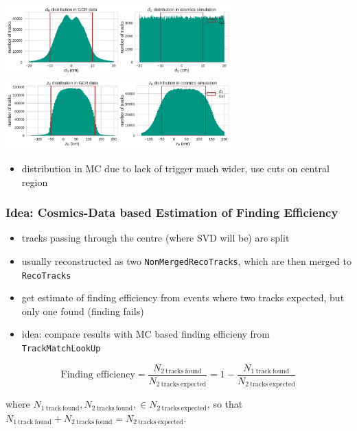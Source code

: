 \documentclass[18pt]{beamer}
\begin{document}
  \begin{frame}
    \begin{center}
      \includegraphics[width=0.65\textwidth]{figures/distributions/gcr_d0_distribution_uncut.pdf}\\
      \includegraphics[width=0.65\textwidth]{figures/distributions/gcr_z0_distribution_uncut.pdf}
    \end{center}
    \begin{itemize}
    \item distribution in MC due to lack of trigger much wider, use cuts on central region
    \end{itemize}
  \end{frame}

  \begin{frame}
    \frametitle{Idea: Cosmics-Data based Estimation of Finding Efficiency}
    \begin{itemize}
    \item tracks passing through the centre (where SVD will be) are split
    \item usually reconstructed as two \texttt{NonMergedRecoTracks},
      which are then merged to \texttt{RecoTracks}
    \item get estimate of finding efficiency from events where two tracks expected, but only one found (finding fails)
    \item idea: compare results with MC based finding efficieny from \texttt{TrackMatchLookUp}
    \end{itemize}
    \pause
    \begin{block}{}
      \begin{equation*}
        \label{eq:cosmic_eff}
        \text{Finding efficiency} = \frac{N_\mathrm{2\ tracks\ found}}{N_\mathrm{2\ tracks\ expected}}
        = 1 - \frac{N_\mathrm{1\ track\ found}}{N_\mathrm{2\ tracks\ expected}}
      \end{equation*}             %
    \end{block}
    where $N_\mathrm{1\ track\ found}, N_\mathrm{2\ tracks\ found}, \in N_\mathrm{2\ tracks\ expected}$, so that $N_\mathrm{1\ track\ found} + N_\mathrm{2\ tracks\ found} = N_\mathrm{2\ tracks\ expected}$.
  \end{frame}
\end{document}
